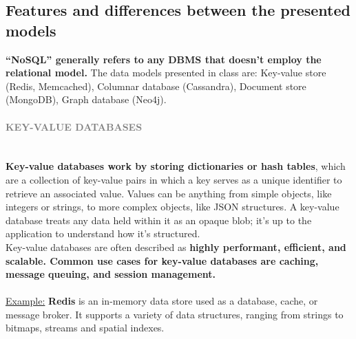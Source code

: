 \documentclass[10pt,a4paper]{article}
\newcommand{\nline}{\\~\\}
\newcommand{\myparagraph}[1]{\paragraph{\normalsize{\textcolor{gray}{\uppercase{\textbf{#1}}}} }\mbox{} \vspace{0.5em}\\}
\begin{document}
\subsection{Features and differences between the presented models}
\textbf{“NoSQL” generally refers to any DBMS that doesn’t employ the relational model.} The data models presented in class are: Key-value store (Redis, Memcached), Columnar database (Cassandra), Document store (MongoDB), Graph database (Neo4j).
\myparagraph{Key-Value databases}
\textbf{Key-value databases work by storing dictionaries or hash tables}, which are a collection of key-value pairs in which a key serves as a unique identifier to retrieve an associated value. Values can be anything from simple objects, like integers or strings, to more complex objects, like JSON structures. A key-value database treats any data held within it as an opaque blob; it’s up to the application to understand how it’s structured. \\
Key-value databases are often described as \textbf{highly performant, efficient, and scalable. Common use cases for key-value databases are caching, message queuing, and session management.}
\nline
\uline{Example:}
\textbf{Redis} is an in-memory data store used as a database, cache, or message broker. It supports a variety of data structures, ranging from strings to bitmaps, streams and spatial indexes.
\end{document}
